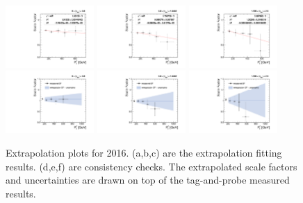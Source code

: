 \begin{figure}[!htbp]
  \centering
 \caption{Extrapolation plots for 2016. (a,b,c) are the extrapolation fitting results. (d,e,f) are consistency checks. The extrapolated scale factors and uncertainties are drawn on top of the tag-and-probe measured results.}
  \includegraphics[width=0.3\textwidth]{fig/Extrapolate_2016_0_Fit.pdf}
  \includegraphics[width=0.3\textwidth]{fig/Extrapolate_2016_1_Fit.pdf}
  \includegraphics[width=0.3\textwidth]{fig/Extrapolate_2016_2_Fit.pdf}\\
  \includegraphics[width=0.3\textwidth]{fig/Extrapolate_2016_0_Check.pdf}
  \includegraphics[width=0.3\textwidth]{fig/Extrapolate_2016_1_Check.pdf}
  \includegraphics[width=0.3\textwidth]{fig/Extrapolate_2016_2_Check.pdf}\\

\end{figure}
